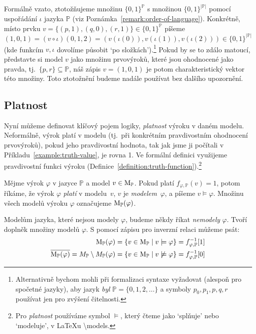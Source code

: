 \begin{remark}
Formálně vzato, ztotožňujeme množinu $\{0,1\}^\mathbb P$ s množinou $\{0,1\}^{|\mathbb P|}$ pomocí uspořádání $\iota$ jazyka $\mathbb P$ (viz Poznámka~\ref{remark:order-of-language}). Konkrétně, místo prvku $v=\{(p,1),(q,0),(r,1)\}\in\{0,1\}^\mathbb P$ píšeme $(1,0,1)=(v\circ\iota)(0,1,2)=(v(\iota(0)),v(\iota(1)),v(\iota(2)))\in\{0,1\}^{|\mathbb P|}$ (kde funkcím $v,\iota$ dovolíme působit `po složkách').\footnote{Alternativně bychom mohli při formalizaci syntaxe vyžadovat (alespoň pro spočetné jazyky), aby jazyk \emph{byl} $\mathbb P=\{0,1,2,\dots\}$ a symboly $p_0,p_1,p,q,r$ používat jen pro zvýšení čitelnosti.} Pokud by se to zdálo matoucí, představte si model $v$ jako množinu prvovýroků, které jsou ohodnocené jako pravda, tj.\ $\{p,r\}\subseteq\mathbb P$, náš zápis $v=(1,0,1)$ je potom charakteristický vektor této množiny. Toto ztotožnění budeme nadále používat bez dalšího upozornění. 
\end{remark}


\subsection{Platnost}

Nyní můžeme definovat klíčový pojem logiky, \emph{platnost} výroku v daném modelu. Neformálně, výrok platí v modelu (tj.\ při konkrétním pravdivostním ohodnocení prvovýroků), pokud jeho pravdivostní hodnota, tak jak jsme ji počítali v Příkladu~\ref{example:truth-value}, je rovna 1. Ve formální definici využijeme pravdivostní funkci výroku (Definice~\ref{definition:truth-function}).\footnote{Pro \emph{platnost} používáme symbol $\models$, který čteme jako `splňuje' nebo `modeluje', v {\LaTeX}u {\textbackslash}models.}

\begin{definition}\label{definition:validity}
    Mějme výrok $\varphi$ v jazyce $\mathbb P$ a model $v\in\operatorname{M}_\mathbb P$. Pokud platí $f_{\varphi,\mathbb P}(v)=1$, potom říkáme, že výrok $\varphi$ \emph{platí} v modelu~$v$, $v$ je \emph{modelem}~$\varphi$, a píšeme $v\models\varphi$. Množinu všech modelů výroku $\varphi$ označujeme $\operatorname{M}_\mathbb P(\varphi)$.
\end{definition}
Modelům jazyka, které nejsou modely $\varphi$, budeme někdy říkat \emph{nemodely} $\varphi$. Tvoří doplněk množiny modelů $\varphi$. S pomocí zápisu pro inverzní relaci můžeme psát:
\begin{align*}
    \operatorname{M}_\mathbb P(\varphi)&=\{v\in\operatorname{M}_\mathbb P\mid v\models \varphi\}=f_{\varphi,\mathbb P}^{-1}[1]\\
    \overline{\operatorname{M}_\mathbb P(\varphi)}=M_\mathbb P\setminus M_\mathbb P(\varphi)&=\{v\in\operatorname{M}_\mathbb P\mid v\not\models \varphi\}=f_{\varphi,\mathbb P}^{-1}[0]
\end{align*}

